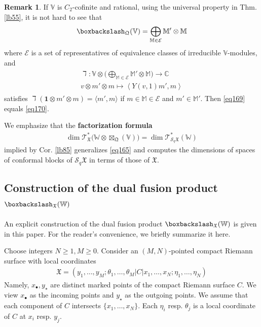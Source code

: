 \documentclass[11pt,b5paper,notitlepage]{article}
\theoremstyle{definition}
\newtheorem{rem}[df]{Remark}
\theoremstyle{plain}
\newcommand{\fk}{\mathfrak}
\newcommand{\mc}{\mathcal}
\newcommand{\idt}{\mathbf{1}}
\newcommand{\scr}{\mathscr}
\newcommand{\blt}{\bullet}
\newcommand{\Vbb}{\mathbb V}
\newcommand{\Wbb}{\mathbb W}
\newcommand{\Mbb}{\mathbb M}
\newcommand{\Cbb}{\mathbb C}
\newcommand{\<}{\left\langle}
\renewcommand{\>}{\right\rangle}
\newcommand{\fx}{\mathfrak{X}}
\newcommand{\bk}[1]{\langle {#1}\rangle}
\newcommand{\bbs}{\boxbackslash}
\newcommand{\fq}{{\mathfrak Q}}
\numberwithin{equation}{section}
\begin{document}
\begin{rem}
If $\Vbb$ is $C_2$-cofinite and rational, using the universal property in Thm. \ref{lb55}, it is not hard to see that
\begin{align}
\bbs_\fq(\Vbb)=\bigoplus_{\Mbb\in\mc E}\Mbb'\otimes\Mbb
\end{align}
where $\mc E$ is a set of representatives of equivalence classes of irreducible $\Vbb$-modules, and 
\begin{gather}
\begin{gathered}
\daleth:\Vbb\otimes\Big(\bigoplus_{\Mbb\in\mc E}\Mbb'\otimes\Mbb\Big)\rightarrow\Cbb\\
v\otimes m'\otimes m\mapsto \<Y(v,1)m',m\> 
\end{gathered}
\end{gather}
satisfies $\daleth(\idt\otimes m'\otimes m)=\bk{m',m}$ if $m\in\Mbb\in\mc E$ and $m'\in\Mbb'$. Then \eqref{eq169} equals \eqref{eq170}.
\end{rem}


We emphasize that the \textbf{factorization formula}
\begin{align}
\boxed{~\dim \scr T_\fx^*\big(\Wbb\otimes\boxtimes_\fq(\Vbb)\big)=\dim \scr T_{\mc S_q\fx}^*(\Wbb)~}
\end{align}
implied by Cor. \ref{lb85} generalizes \eqref{eq165} and computes the dimensions of spaces of conformal blocks of $\mc S_q\fx$ in terms of those of $\fx$.



\subsection{Construction of the dual fusion product $\bbs_\fx(\Wbb)$}
An explicit construction of the dual fusion product $\bbs_\fx(\Wbb)$ is given in this paper. For the reader’s convenience, we briefly summarize it here.

Choose integers $N\geq 1,M\geq 0$. Consider an $(M,N)$-pointed compact Riemann surface with local coordinates
\begin{align}
\fk X=(y_1,\dots,y_M;\theta_1,\dots,\theta_M|C|x_1,\dots,x_N;\eta_1,\dots,\eta_N)
\end{align}
Namely, $x_\blt,y_\star$ are distinct marked points of the compact Riemann surface $C$. We view $x_\blt$ as the incoming points and $y_\star$ as the outgoing points. We assume that each component of $C$ intersects $\{x_1,\dots,x_N\}$. Each $\eta_i$ resp. $
\theta_j$ is a local coordinate of $C$ at $x_i$ resp. $y_j$.
\end{document}
